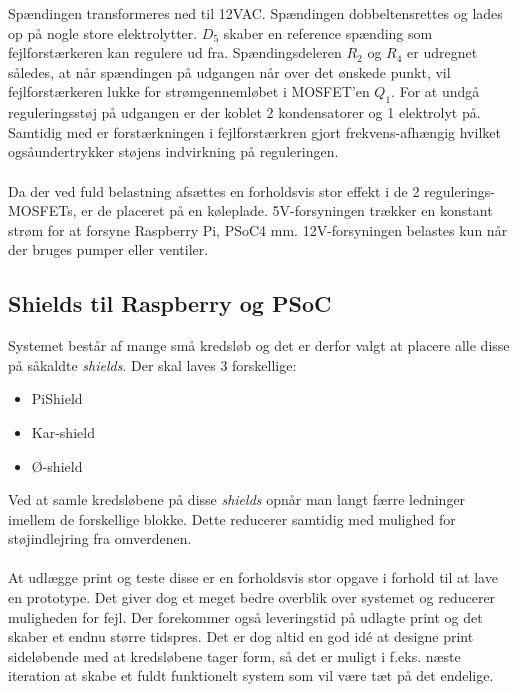 Spændingen transformeres ned til 12VAC. Spændingen dobbeltensrettes og lades op på nogle store elektrolytter. $D_5$ skaber en reference spænding som fejlforstærkeren kan regulere ud fra. Spændingsdeleren $R_2$ og $R_4$ er udregnet således, at når spændingen på udgangen når over det ønskede punkt, vil fejlforstærkeren lukke for strømgennemløbet i MOSFET'en $Q_1$. For at undgå reguleringsstøj på udgangen er der koblet 2 kondensatorer og 1 elektrolyt på. Samtidig med er forstærkningen i fejlforstærkren gjort frekvens-afhængig hvilket ogsåundertrykker støjens indvirkning på reguleringen.
\\\\
Da der ved fuld belastning afsættes en forholdsvis stor effekt i de 2 regulerings-MOSFETs, er de placeret på en køleplade. 5V-forsyningen trækker en konstant strøm for at forsyne Raspberry Pi, PSoC4 mm. 12V-forsyningen belastes kun når der bruges pumper eller ventiler.

\subsection{Shields til Raspberry og PSoC}
Systemet består af mange små kredsløb og det er derfor valgt at placere alle disse på såkaldte \emph{shields}. Der skal laves 3 forskellige:

\begin{itemize}
\item PiShield
\item Kar-shield
\item Ø-shield
\end{itemize}

Ved at samle kredsløbene på disse \emph{shields} opnår man langt færre ledninger imellem de forskellige blokke. Dette reducerer samtidig med mulighed for støjindlejring fra omverdenen.
\\\\
At udlægge print og teste disse er en forholdsvis stor opgave i forhold til at lave en prototype. Det giver dog et meget bedre overblik over systemet og reducerer muligheden for fejl. Der forekommer også leveringstid på udlagte print og det skaber et endnu større tidspres. Det er dog altid en god idé at designe print sideløbende med at kredsløbene tager form, så det er muligt i f.eks. næste iteration at skabe et fuldt funktionelt system som vil være tæt på det endelige.